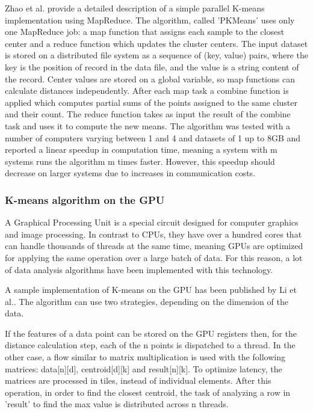 \documentclass[12pt]{article}
\begin{document}
	Zhao et al.\cite{ParallelKmeansClusteringBasedOnMapReduce} provide a detailed description of a simple parallel K-means implementation using MapReduce. The algorithm, called 'PKMeans' uses only one MapReduce job: a map function that assigns each sample to the closest center and a reduce function which updates the cluster centers. The input dataset is stored on a distributed file system as a sequence of (key, value) pairs, where the key is the position of record in the data file, and the value is a string content of the record. Center values are stored on a global variable, so map functions can calculate distances independently. After each map task a combine function is applied which computes partial sums of the points assigned to the same cluster and their count. The reduce function takes as input the result of the combine task and uses it to compute the new means. The algorithm was tested with a number of computers varying between 1 and 4 and datasets of 1 up to 8GB and reported a linear speedup in computation time, meaning a system with m systems runs the algorithm m times faster. However, this speedup should decrease on larger systems due to increases in communication costs.

	\subsubsection{K-means algorithm on the GPU}
	A Graphical Processing Unit\cite{GPUDef} is a special circuit designed for computer graphics and image processing. In contrast to CPUs, they have over a hundred cores that can handle thousands of threads at the same time, meaning GPUs are optimized for applying the same operation over a large batch of data. For this reason, a lot of data analysis algorithms have been implemented with this technology.
	
	A sample implementation of K-means on the GPU has been published by Li et al.\cite{GPUKmeans}. The algorithm can use two strategies, depending on the dimension of the data. 
	
	If the features of a data point can be stored on the GPU registers then, for the distance calculation step, each of the n points is dispatched to a thread. In the other case, a flow similar to matrix multiplication is used with the following matrices: data[n][d], centroid[d][k] and result[n][k]. To optimize latency, the matrices are processed in tiles, instead of individual elements. After this operation, in order to find the closest centroid, the task of analyzing a row in 'result' to find the max value is distributed across n threads.
	
\end{document}
